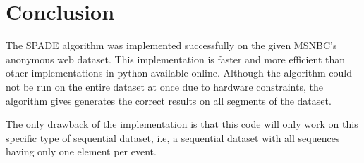 \section{Conclusion}

The SPADE algorithm was implemented successfully on the given MSNBC's anonymous web dataset. This implementation is faster and more efficient than other implementations in python available online. Although the algorithm could not be run on the entire dataset at once due to hardware constraints, the algorithm gives generates the correct results on all segments of the dataset.

The only drawback of the implementation is that this code will only work on this specific type of sequential dataset, i.e, a sequential dataset with all sequences having only one element per event.